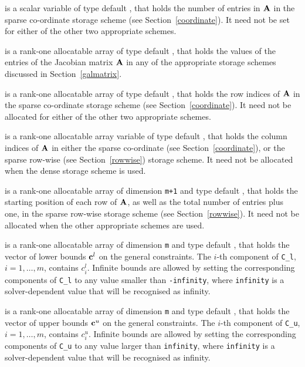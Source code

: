 \documentclass{galahad}
\begin{document}
\begin{description}
\begin{description}
 is a scalar variable of type default \integer, that
holds the number of entries in ${\mathbf{A}}$
in the sparse co-ordinate storage scheme (see Section~\ref{coordinate}).
It need not be set for either of the other two appropriate schemes.

 is a rank-one allocatable array of type default \realdp, that holds
the values of the entries of the Jacobian matrix ${\mathbf{A}}$ in any of the
appropriate storage schemes discussed in Section~\ref{galmatrix}.

 is a rank-one allocatable array of type default \integer,
that holds the row indices of ${\mathbf{A}}$ in the sparse co-ordinate storage
scheme (see Section~\ref{coordinate}).
It need not be allocated for either of the other two appropriate schemes.

 is a rank-one allocatable array variable of type default \integer,
that holds the column indices of ${\mathbf{A}}$ in either the sparse co-ordinate
(see Section~\ref{coordinate}), or the sparse row-wise
(see Section~\ref{rowwise}) storage scheme.
It need not be allocated when the dense storage scheme is used.

 is a rank-one allocatable array of dimension {\tt m+1} and type
default \integer, that holds the
starting position of each row of ${\mathbf{A}}$, as well
as the total number of entries plus one, in the sparse row-wise storage
scheme (see Section~\ref{rowwise}). It need not be allocated when the
other appropriate schemes are used.

\end{description}

 is a rank-one allocatable array of dimension {\tt m} and type
default \realdp, that holds the vector of lower bounds ${\mathbf{c}}^{l}$
on the general constraints. The $i$-th component of
{\tt C\_l}, $i = 1, \ldots , m$, contains $c_{i}^{l}$.
Infinite bounds are allowed by setting the corresponding
components of {\tt C\_l} to any value smaller than {\tt -infinity},
where {\tt infinity} is a  solver-dependent value that will be recognised as
infinity.

 is a rank-one allocatable array of dimension {\tt m} and type
default \realdp, that holds the vector of upper bounds ${\mathbf{c}}^{u}$
on the general constraints. The $i$-th component of
{\tt C\_u}, $i = 1,  \ldots ,  m$, contains $c_{i}^{u}$.
Infinite bounds are allowed by setting the corresponding
components of {\tt C\_u} to any value larger than {\tt infinity},
where {\tt infinity} is a  solver-dependent value that will be recognised as
infinity.


\end{description}
\end{document}
